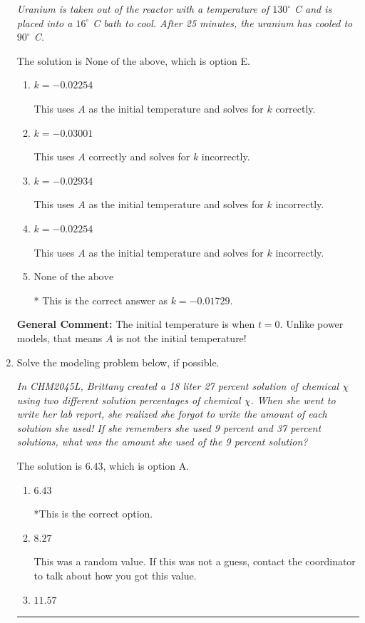 \documentclass{extbook}[14pt]
\newcommand{\litem}[1]{\item #1

\rule{\textwidth}{0.4pt}}
\begin{document}
\begin{enumerate}
{\begin{center}
    \textit{ Uranium is taken out of the reactor with a temperature of $130^{\circ}$ C and is placed into a $16^{\circ}$ C bath to cool. After 25 minutes, the uranium has cooled to $90^{\circ}$ C. }
\end{center}


The solution is \( \text{None of the above} \), which is option E.\begin{enumerate}[label=\Alph*.]
\item \( k = -0.02254 \)

This uses $A$ as the initial temperature and solves for $k$ correctly.
\item \( k = -0.03001 \)

This uses $A$ correctly and solves for $k$ incorrectly.
\item \( k = -0.02934 \)

This uses $A$ as the initial temperature and solves for $k$ incorrectly.
\item \( k = -0.02254 \)

This uses $A$ as the initial temperature and solves for $k$ incorrectly.
\item \( \text{None of the above} \)

* This is the correct answer as $k = -0.01729$.
\end{enumerate}

\textbf{General Comment:} The initial temperature is when $t = 0$. Unlike power models, that means $A$ is not the initial temperature!
}
\litem{
Solve the modeling problem below, if possible.

\begin{center}
    \textit{ In CHM2045L, Brittany created a 18 liter 27 percent solution of chemical $\chi$ using two different solution percentages of chemical $\chi$. When she went to write her lab report, she realized she forgot to write the amount of each solution she used! If she remembers she used 9 percent and 37 percent solutions, what was the amount she used of the 9 percent solution? }
\end{center}


The solution is \( 6.43 \), which is option A.\begin{enumerate}[label=\Alph*.]
\item \( 6.43 \)

*This is the correct option.
\item \( 8.27 \)

This was a random value. If this was not a guess, contact the coordinator to talk about how you got this value.
\item \( 11.57 \)


\end{enumerate}}
\end{enumerate}
\end{document}
